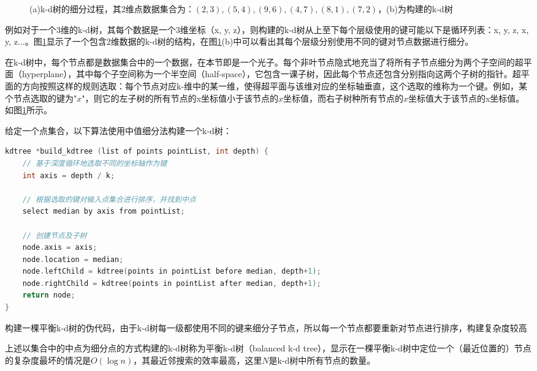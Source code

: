 \begin{figure}
\begin{center}
\begin{subfigure}[b]{.49\textwidth}
		\caption{}
	\end{subfigure}
\end{center}
\caption{(a)k-d树的细分过程，其2维点数据集合为：$(2,3), (5,4), (9,6), (4,7), (8,1), (7,2)$，(b)为构建的k-d树}
\label{f:pm-photon-kd-tree}
\end{figure}


例如对于一个3维的k-d树，其每个数据是一个3维坐标（x, y, z），则构建的k-d树从上至下每个层级使用的键可能以下是循环列表：x, y, z, x, y, z...。图\ref{f:pm-photon-kd-tree}显示了一个包含2维数据的k-d树的结构，在图\ref{f:pm-photon-kd-tree}(b)中可以看出其每个层级分别使用不同的键对节点数据进行细分。

在k-d树中，每个节点都是数据集合中的一个数据，在本节即是一个光子。每个非叶节点隐式地充当了将所有子节点细分为两个子空间的超平面（hyperplane），其中每个子空间称为一个半空间（half-space），它包含一课子树，因此每个节点还包含分别指向这两个子树的指针。超平面的方向按照这样的规则选取：每个节点对应k-维中的某一维，使得超平面与该维对应的坐标轴垂直，这个选取的维称为一个键。例如，某个节点选取的键为"$x$"，则它的左子树的所有节点的x坐标值小于该节点的$x$坐标值，而右子树种所有节点的$x$坐标值大于该节点的x坐标值。如图\ref{f:pm-photon-kd-tree}所示。

给定一个点集合，以下算法使用中值细分法构建一个k-d树：

\begin{algorithm}
\begin{lstlisting}[language=C++, mathescape]
kdtree *build_kdtree (list of points pointList, int depth) {
    // 基于深度循环地选取不同的坐标轴作为键
    int axis = depth / k;
        
    // 根据选取的键对输入点集合进行排序，并找到中点
    select median by axis from pointList;
        
    // 创建节点及子树
    node.axis = axis;
    node.location = median;
    node.leftChild = kdtree(points in pointList before median, depth+1);
    node.rightChild = kdtree(points in pointList after median, depth+1);
    return node;
}
\end{lstlisting}
\caption{构建一棵平衡k-d树的伪代码，由于k-d树每一级都使用不同的键来细分子节点，所以每一个节点都要重新对节点进行排序，构建复杂度较高}
\label{a:pm-balancing-photon-map}
\end{algorithm}

上述以集合中的中点为细分点的方式构建的k-d树称为平衡k-d树（balanced k-d tree），\cite{a:MultidimensionalBinarySearchTreesUsedforAssociativeSearching}显示在一棵平衡k-d树中定位一个（最近位置的）节点的复杂度最坏的情况是$O(\log n )$，其最近邻搜索的效率最高，这里$N$是k-d树中所有节点的数量。


